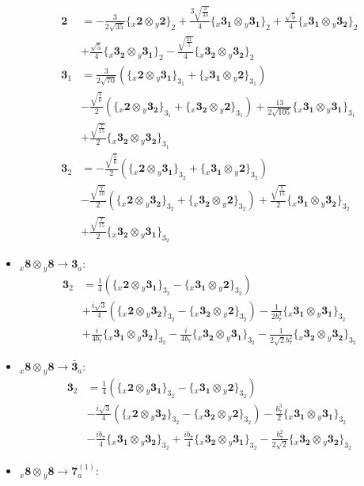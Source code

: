 \documentclass[english]{article}
\newcommand{\rep}[1]{\mathbf{#1}}
\newcommand{\repx}[2]{{}_{#2}\mathbf{#1}}
\newcommand{\tsprodx}[2]{\repx{#1}{x}\otimes\repx{#2}{y}}
\newcommand{\subcgs}[3]{\big\{ \tsprodx{#1}{#2}\big\}^{}_{#3}}
\begin{document}
\begin{itemize}
\begin{align*}
\rep{2} & = -\frac{3}{2 \sqrt{35}}\subcgs{2}{2}{2}+\frac{3 \sqrt{\frac{3}{35}}}{4}\subcgs{3_{1}}{3_{1}}{2}+\frac{\sqrt{5}}{4}\subcgs{3_{1}}{3_{2}}{2} \\ 
 & +\frac{\sqrt{5}}{4}\subcgs{3_{2}}{3_{1}}{2}-\frac{\sqrt{\frac{21}{5}}}{4}\subcgs{3_{2}}{3_{2}}{2}
\\
\rep{3}_{1} & = \frac{3}{2 \sqrt{70}}\left(\subcgs{2}{3_{1}}{3_{1}}+\subcgs{3_{1}}{2}{3_{1}}\right) \\ 
 & -\frac{\sqrt{\frac{5}{6}}}{2}\left(\subcgs{2}{3_{2}}{3_{1}}+\subcgs{3_{2}}{2}{3_{1}}\right)+\frac{13}{2 \sqrt{105}}\subcgs{3_{1}}{3_{1}}{3_{1}} \\ 
 & +\frac{\sqrt{\frac{7}{15}}}{2}\subcgs{3_{2}}{3_{2}}{3_{1}}
\\
\rep{3}_{2} & = -\frac{\sqrt{\frac{5}{6}}}{2}\left(\subcgs{2}{3_{1}}{3_{2}}+\subcgs{3_{1}}{2}{3_{2}}\right) \\ 
 & -\frac{\sqrt{\frac{7}{10}}}{2}\left(\subcgs{2}{3_{2}}{3_{2}}+\subcgs{3_{2}}{2}{3_{2}}\right)+\frac{\sqrt{\frac{7}{15}}}{2}\subcgs{3_{1}}{3_{2}}{3_{2}} \\ 
 & +\frac{\sqrt{\frac{7}{15}}}{2}\subcgs{3_{2}}{3_{1}}{3_{2}}
\end{align*}
\item $\tsprodx{8}{8}\to\rep{3}_{a}$:
\begin{align*}
\rep{3}_{2} & = \frac{1}{4}\left(\subcgs{2}{3_{1}}{3_{2}}-\subcgs{3_{1}}{2}{3_{2}}\right) \\ 
 & +\frac{i \sqrt{3}}{4}\left(\subcgs{2}{3_{2}}{3_{2}}-\subcgs{3_{2}}{2}{3_{2}}\right)-\frac{1}{2 b_7^3}\subcgs{3_{1}}{3_{1}}{3_{2}} \\ 
 & +\frac{i}{4 b_7}\subcgs{3_{1}}{3_{2}}{3_{2}}-\frac{i}{4 b_7}\subcgs{3_{2}}{3_{1}}{3_{2}}-\frac{1}{2 \sqrt{2} b_7^2}\subcgs{3_{2}}{3_{2}}{3_{2}}
\end{align*}
\item $\tsprodx{8}{8}\to\rep{\bar{3}}_{a}$:
\begin{align*}
\rep{3}_{2} & = \frac{1}{4}\left(\subcgs{2}{3_{1}}{3_{2}}-\subcgs{3_{1}}{2}{3_{2}}\right) \\ 
 & -\frac{i \sqrt{3}}{4}\left(\subcgs{2}{3_{2}}{3_{2}}-\subcgs{3_{2}}{2}{3_{2}}\right)-\frac{b_7^3}{2}\subcgs{3_{1}}{3_{1}}{3_{2}} \\ 
 & -\frac{i b_7}{4}\subcgs{3_{1}}{3_{2}}{3_{2}}+\frac{i b_7}{4}\subcgs{3_{2}}{3_{1}}{3_{2}}-\frac{b_7^2}{2 \sqrt{2}}\subcgs{3_{2}}{3_{2}}{3_{2}}
\end{align*}
\item $\tsprodx{8}{8}\to\rep{7}_{a}^{(1)}$:

\end{itemize}
\end{document}

